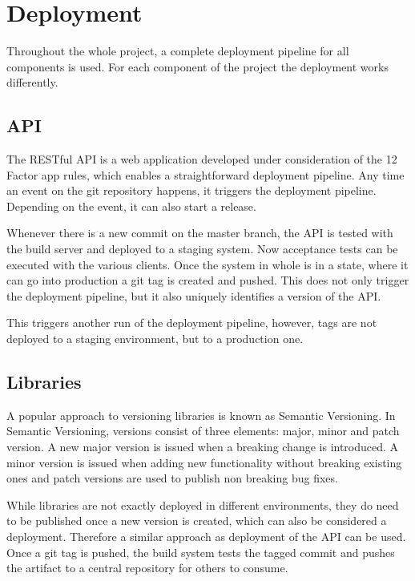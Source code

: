 \section{Deployment}

Throughout the whole project, a complete deployment pipeline for all components
is used. For each component of the project the deployment works differently.

\subsection{API}

The RESTful API is a web application developed under consideration of the 12 Factor
app rules, which enables a straightforward deployment pipeline. Any time an
event on the git repository happens, it triggers the deployment pipeline.
Depending on the event, it can also start a release.

Whenever there is a new commit on the master branch, the API is tested with the
build server and deployed to a staging system. Now acceptance tests can be
executed with the various clients. Once the system in whole is in a state,
where it can go into production a git tag is created and pushed. This does not
only trigger the deployment pipeline, but it also uniquely identifies a
version of the API.

This triggers another run of the deployment pipeline, however, tags are not
deployed to a staging environment, but to a production one.

\subsection{Libraries}

A popular approach to versioning libraries is known as Semantic Versioning. In
Semantic Versioning, versions consist of three elements: major, minor and patch version.
A new major version is issued when a breaking change is introduced. A minor
version is issued when adding new functionality without breaking existing ones
and patch versions are used to publish non breaking bug fixes.

While libraries are not exactly deployed in different environments, they do
need to be published once a new version is created, which can also be
considered a deployment. Therefore a similar approach as deployment of the API
can be used. Once a git tag is pushed, the build system tests the tagged commit
and pushes the artifact to a central repository for others to consume.

